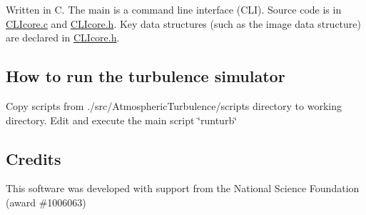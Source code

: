 Written in C. The main is a command line interface (C\+L\+I). Source code is in \hyperlink{CLIcore_8c}{C\+L\+Icore.\+c} and \hyperlink{CLIcore_8h}{C\+L\+Icore.\+h}. Key data structures (such as the image data structure) are declared in \hyperlink{CLIcore_8h}{C\+L\+Icore.\+h}.

\subsection*{How to run the turbulence simulator}

Copy scripts from ./src/\+Atmospheric\+Turbulence/scripts directory to working directory. Edit and execute the main script \char`\"{}runturb\char`\"{}

\subsection*{Credits}

This software was developed with support from the National Science Foundation (award \#1006063) 
